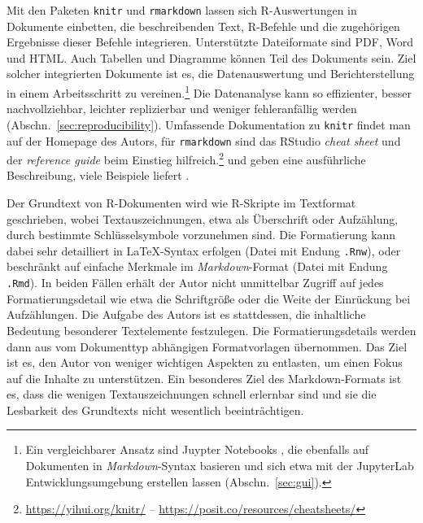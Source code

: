 Mit den Paketen \lstinline!knitr! \cite{Xie2012} und \lstinline!rmarkdown! \cite{RStudio2014a} lassen sich R-Auswertungen in Dokumente einbetten, die beschreibenden Text, R-Befehle und die zugehörigen Ergebnisse dieser Befehle integrieren. Unterstützte Dateiformate sind PDF, Word und HTML. Auch Tabellen und Diagramme können Teil des Dokuments sein. Ziel solcher integrierten Dokumente ist es, die Datenauswertung und Berichterstellung in einem Arbeitsschritt zu vereinen.\footnote{Ein vergleichbarer Ansatz sind Juypter Notebooks \cite{Kluyver2016}, die ebenfalls auf Dokumenten in \emph{Markdown}-Syntax basieren und sich etwa mit der JupyterLab Entwicklungsumgebung erstellen lassen (Abschn.\ \ref{sec:gui}).} Die Datenanalyse kann so effizienter, besser nachvollziehbar, leichter replizierbar und weniger fehleranfällig werden (Abschn.\ \ref{sec:reproducibility}). Umfassende Dokumentation zu \lstinline!knitr! findet man auf der Homepage des Autors, für \lstinline!rmarkdown! sind das RStudio \emph{cheat sheet} und der \emph{reference guide} beim Einstieg hilfreich.\footnote{\url{https://yihui.org/knitr/} -- \url{https://posit.co/resources/cheatsheets/}}  und  geben eine ausführliche Beschreibung, viele Beispiele liefert .

Der Grundtext von R-Dokumenten wird wie R-Skripte im Textformat geschrieben, wobei Textauszeichnungen, etwa als Überschrift oder Aufzählung, durch bestimmte Schlüsselsymbole vorzunehmen sind. Die Formatierung kann dabei sehr detailliert in \LaTeX-Syntax erfolgen (Datei mit Endung \lstinline!.Rnw!), oder beschränkt auf einfache Merkmale im \emph{Markdown}-Format (Datei mit Endung \lstinline!.Rmd!). In beiden Fällen erhält der Autor nicht unmittelbar Zugriff auf jedes Formatierungsdetail wie etwa die Schriftgröße oder die Weite der Einrückung bei Aufzählungen. Die Aufgabe des Autors ist es stattdessen, die inhaltliche Bedeutung besonderer Textelemente festzulegen. Die Formatierungsdetails werden dann aus vom Dokumenttyp abhängigen Formatvorlagen übernommen. Das Ziel ist es, den Autor von weniger wichtigen Aspekten zu entlasten, um einen Fokus auf die Inhalte zu unterstützen. Ein besonderes Ziel des Markdown-Formats ist es, dass die wenigen Textauszeichnungen schnell erlernbar sind und sie die Lesbarkeit des Grundtexts nicht wesentlich beeinträchtigen.


